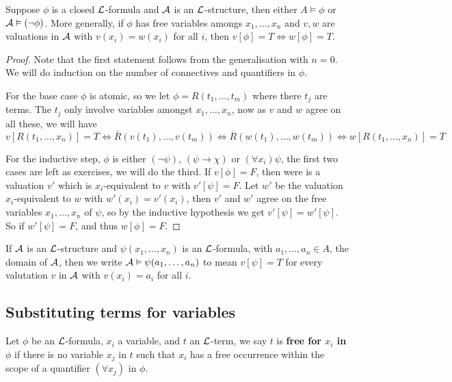 \documentclass{article}
\begin{document}
\begin{proposition}
    Suppose $\phi$ is a closed $\mathcal{L}$-formula and $\mathcal{A}$ is an $\mathcal{L}$-structure, then either $A\vDash\phi$ or $\mathcal{A}\vDash(\neg\phi)$. More generally, if $\phi$ has free variables amongs $x_1,\ldots,x_n$ and $v,w$ are valuations in $\mathcal{A}$ with $v(x_i)=w(x_i)$ for all $i$, then $v[\phi]=T \iff w[\phi]=T$.
    \begin{proof}
        Note that the first statement follows from the generalisation with $n=0$. We will do induction on the number of connectives and quantifiers in $\phi$.

        For the base case $\phi$ is atomic, so we let $\phi = R(t_1,\ldots,t_m)$ where there $t_j$ are terms. The $t_j$ only involve variables amongst $x_1,\ldots,x_n$, now as $v$ and $w$ agree on all these, we will have \[
        v[R(t_1,\ldots,x_n)]=T\iff \overline{R}(v(t_1),\ldots,v(t_m))\iff \overline{R}(w(t_1),\ldots,w(t_m))\iff w[R(t_1,\ldots,x_n)]=T
        \]

        For the inductive step, $\phi$ is either $(\neg\psi)$, $(\psi\rightarrow\chi)$ or $(\forall x_i)\psi$, the first two cases are left as exercises, we will do the third. If $v[\phi]=F$, then were is a valuation $v'$ which is $x_i$-equivalent to $v$ with $v'[\psi]=F$. Let $w'$ be the valuation $x_i$-equivalent to $w$ with $w'(x_i)=v'(x_i)$, then $v'$ and $w'$ agree on the free variables $x_1,\ldots,x_n$ of $\psi$, so by the inductive hypothesis we get $v'[\psi]=w'[\psi]$. So if $w'[\psi]=F$, and thus $w[\phi]=F$.
    \end{proof}
\end{proposition}

If $\mathcal{A}$ is an $\mathcal{L}$-structure and $\psi(x_1,\ldots,x_n)$ is an $\mathcal{L}$-formula, with $a_1,\ldots, a_n\in A$, the domain of $\mathcal{A}$, then we write $\mathcal{A}\vDash \psi(a_1,\ldots,a_n)$ to mean $v[\psi]=T$ for every valutation $v$ in $\mathcal{A}$ with $v(x_i)=a_i$ for all $i$.

\subsection{Substituting terms for variables}

\begin{definition}
    Let $\phi$ be an $\mathcal{L}$-formula, $x_i$ a variable, and $t$ an $\mathcal{L}$-term, we say $t$ is \textbf{free for $x_i$ in $\phi$} if there is no variable $x_j$ in $t$ such that $x_i$ has a free occurrence within the scope of a quantifier $(\forall x_j)$ in $\phi$.
\end{definition}
\end{document}
